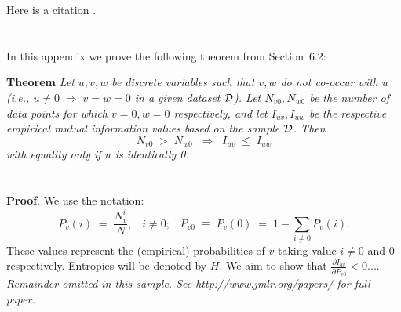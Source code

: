\documentclass[twoside,11pt]{article}
\newcommand{\dataset}{{\cal D}}
\newcommand{\fracpartial}[2]{\frac{\partial #1}{\partial  #2}}
\begin{document}
%

Here is a citation \cite{chow:68}.




\newpage

\appendix
\section{}
\label{app:theorem}



In this appendix we prove the following theorem from
Section~6.2:

\noindent
{\bf Theorem} {\it Let $u,v,w$ be discrete variables such that $v, w$ do
not co-occur with $u$ (i.e., $u\neq0\;\Rightarrow \;v=w=0$ in a given
dataset $\dataset$). Let $N_{v0},N_{w0}$ be the number of data points for
which $v=0, w=0$ respectively, and let $I_{uv},I_{uw}$ be the
respective empirical mutual information values based on the sample
$\dataset$. Then
\[
	N_{v0} \;>\; N_{w0}\;\;\Rightarrow\;\;I_{uv} \;\leq\;I_{uw}
\]
with equality only if $u$ is identically 0.} \hfill\BlackBox

\section{}

\noindent
{\bf Proof}. We use the notation:
\[
P_v(i) \;=\;\frac{N_v^i}{N},\;\;\;i \neq 0;\;\;\;
P_{v0}\;\equiv\;P_v(0)\; = \;1 - \sum_{i\neq 0}P_v(i).
\]
These values represent the (empirical) probabilities of $v$
taking value $i\neq 0$ and 0 respectively.  Entropies will be denoted
by $H$. We aim to show that $\fracpartial{I_{uv}}{P_{v0}} < 0$....\\

{\noindent \em Remainder omitted in this sample. See http://www.jmlr.org/papers/ for full paper.}


\vskip 0.2in 

\end{document}
